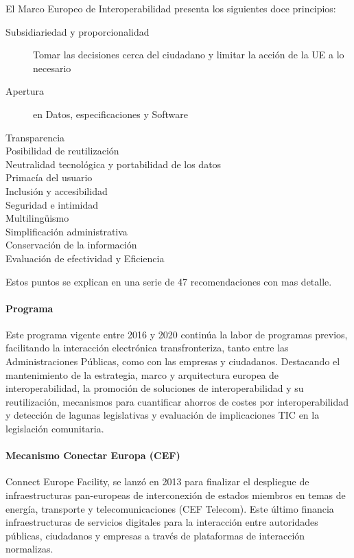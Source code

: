             El Marco Europeo de Interoperabilidad presenta los siguientes doce principios:
            \begin{description}
                \item[Subsidiariedad y proporcionalidad] Tomar las decisiones cerca del ciudadano y limitar la acción de la UE a lo necesario
                \item[Apertura] en Datos, especificaciones y Software
                \item[Transparencia]
                \item[Posibilidad de reutilización]
                \item[Neutralidad tecnológica y portabilidad de los datos]
                \item[Primacía del usuario]
                \item[Inclusión y accesibilidad]
                \item[Seguridad e intimidad]
                \item[Multilingüismo]
                \item[Simplificación administrativa]
                \item[Conservación de la información]
                \item[Evaluación de efectividad y Eficiencia]
            \end{description}
            Estos puntos se explican en una serie de 47 recomendaciones con mas detalle.
            
        \paragraph{Programa \ISA} %
            Este programa vigente entre 2016 y 2020 continúa la labor de programas previos, facilitando la interacción electrónica transfronteriza, tanto entre las Administraciones Públicas, como con las empresas y ciudadanos. Destacando el mantenimiento de la estrategia, marco y arquitectura europea de interoperabilidad, la promoción de soluciones de interoperabilidad y su reutilización, mecanismos para cuantificar ahorros de costes por interoperabilidad y detección de lagunas legislativas y evaluación de implicaciones TIC en la legislación comunitaria.

        \paragraph{Mecanismo Conectar Europa (CEF)} %
            Connect Europe Facility, se lanzó en 2013 para finalizar el despliegue de infraestructuras pan-europeas de interconexión de estados miembros en temas de energía, transporte y telecomunicaciones (CEF Telecom). Este último financia infraestructuras de servicios digitales para la interacción entre autoridades públicas, ciudadanos y empresas a través de plataformas de interacción normalizas.

